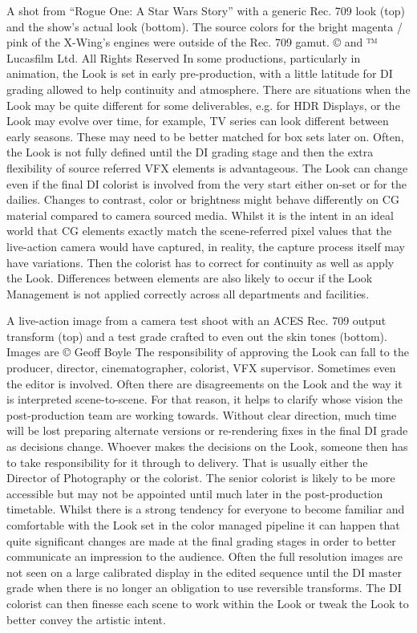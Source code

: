 A shot from “Rogue One: A Star Wars Story” with a generic Rec. 709 look (top) and the show’s actual look (bottom). The source colors for the bright magenta / pink of the X-Wing’s engines were outside of the Rec. 709 gamut.
© and ™ Lucasfilm Ltd. All Rights Reserved
In some productions, particularly in animation, the Look is set in early pre-production, with a little latitude for DI grading allowed to help continuity and atmosphere. There are situations when the Look may be quite different for some deliverables, e.g. for HDR Displays, or the Look may evolve over time, for example, TV series can look different between early seasons. These may need to be better matched for box sets later on. Often, the Look is not fully defined until the DI grading stage and then the extra flexibility of source referred VFX elements is advantageous. The Look can change even if the final DI colorist is involved from the very start either on-set or for the dailies. Changes to contrast, color or brightness might behave differently on CG material compared to camera sourced media. Whilst it is the intent in an ideal world that CG elements exactly match the scene-referred pixel values that the live-action camera would have captured, in reality, the capture process itself may have variations. Then the colorist has to correct for continuity as well as apply the Look. Differences between elements are also likely to occur if the Look Management is not applied correctly across all departments and facilities.



 A live-action image from a camera test shoot with an ACES Rec. 709 output transform (top) and a test grade crafted to even out the skin tones (bottom). 
Images are © Geoff Boyle
The responsibility of approving the Look can fall to the producer, director, cinematographer, colorist, VFX supervisor. Sometimes even the editor is involved. Often there are disagreements on the Look and the way it is interpreted scene-to-scene. For that reason, it helps to clarify whose vision the post-production team are working towards. Without clear direction, much time will be lost preparing alternate versions or re-rendering fixes in the final DI grade as decisions change. Whoever makes the decisions on the Look, someone then has to take responsibility for it through to delivery. That is usually either the Director of Photography or the colorist. The senior colorist is likely to be more accessible but may not be appointed until much later in the post-production timetable. Whilst there is a strong tendency for everyone to become familiar and comfortable with the Look set in the color managed pipeline it can happen that quite significant changes are made at the final grading stages in order to better communicate an impression to the audience.  Often the full resolution images are not seen on a large calibrated display in the edited sequence until the DI master grade when there is no longer an obligation to use reversible transforms. The DI colorist  can then finesse each scene to work within the Look or tweak the Look to better convey the artistic intent.

